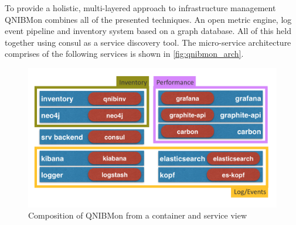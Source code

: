 To provide a holistic, multi-layered approach to infrastructure management QNIBMon combines all of the presented techniques.
An open metric engine, log event pipeline and inventory system based on a graph database. All of this held together using consul as a service discovery
tool.
The micro-service architecture comprises of the following services is shown in \autoref{fig:qnibmon_arch}.
\begin{figure}[!ht]
    \includegraphics[width=.4\textwidth]{images/png/qnibmon_arch.png}
    \caption{\label{fig:qnibmon_arch}Composition of QNIBMon from a container and service view}
\end{figure}